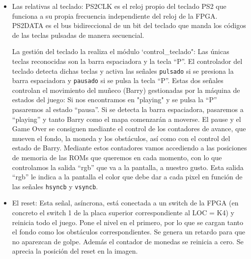 \documentclass[11pt, a4paper, spanish, openright, twoside]{book}
\begin{document}
	\begin{itemize}	
	\item Las relativas al teclado: PS2CLK es el reloj propio del teclado PS2 que funciona a  su propia frecuencia independiente 
 	del reloj de la FPGA. PS2DATA es el bus bidireccional de un bit del teclado que manda los códigos de las teclas pulsadas de manera secuencial.
	
	La gestión del teclado la realiza el módulo `control\_teclado":	Las únicas teclas reconocidas son la barra espaciadora y la tecla ``P''. El controlador del teclado detecta dichas teclas y activa las señales \texttt{pulsado} si se presiona la barra espaciadora y \texttt{pausado} si se pulsa la tecla ``P''.	
	Estas dos señales controlan el movimiento del muñeco (Barry) gestionadas por la máquina de estados del juego: Si nos encontramos en "playing" y se pulsa la ``P''  pasaremos al estado ``pausa''. Si se detecta la barra espaciadora, pasaremos
	 a ``playing'' y tanto Barry como el mapa comenzarán a moverse. El pause y el Game Over se consiguen mediante el control de los contadores de avance, que mueven el fondo, la moneda y los obstáculos, así como con el control del estado de Barry.
	Mediante estos contadores vamos accediendo a las posiciones de memoria de las ROMs que queremos en cada momento, con lo que controlamos la salida ``rgb''  que va a la pantalla, a nuestro gusto. Esta salida ``rgb'' le indica a la pantalla el color que debe dar a cada pixel
	en función de las señales \texttt{hsyncb} y \texttt{vsyncb}.

	\item El reset:	Esta señal, asíncrona, está conectada a un switch de la FPGA (en concreto el switch 1 de la placa superior correspondiente al LOC = K4) y reinicia todo el juego. Pone el nivel en el primero, por lo que se cargan tanto el fondo como los obstáculos correspondientes. Se genera un retardo para que no aparezcan de golpe. Además el contador de monedas se reinicia a cero. Se aprecia la posición del reset en la imagen.
	

\end{itemize}
\end{document}
